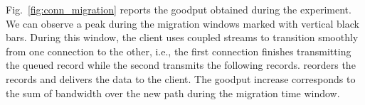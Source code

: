 
Fig.~\ref{fig:conn_migration} reports the goodput obtained during the experiment. We can observe a peak during the migration windows marked with
vertical black bars. %
During this window, the client uses coupled streams to transition smoothly from
one \tcp connection to the other, i.e., the first \tcp connection finishes
transmitting the queued \tcpls record while the second transmits the following
records.
\tcpls reorders the records and delivers the data to the client. The goodput increase corresponds to the sum of bandwidth over the new path during the migration time window.

